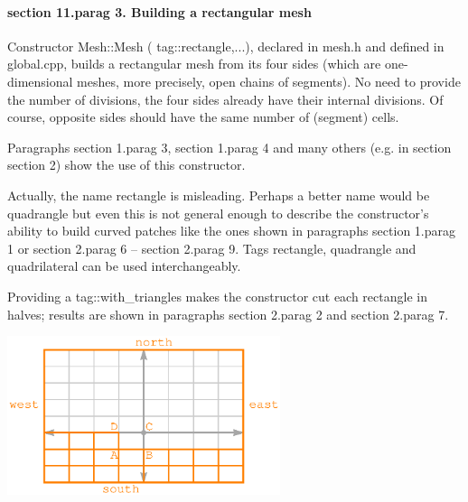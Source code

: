 \paragraph{\numb section 11.\numb parag 3. Building a rectangular mesh}

Constructor {\codett Mesh::Mesh ( tag::rectangle,...)}, declared in {\codett mesh.h} and defined in
{\codett global.cpp}, builds a rectangular mesh from its
four sides (which are one-dimensional meshes, more precisely, open chains of segments).
No need to provide the number of divisions, the four sides already have their internal divisions.
Of course, opposite sides should have the same number of (segment) cells.

Paragraphs \numb section 1.\numb parag 3, \numb section 1.\numb parag 4 and many others
(e.g. in section \numb section 2) show the use of this constructor.

Actually, the name {\codett rectangle} is misleading.
Perhaps a better name would be {\codett quadrangle} but even this is not general enough to
describe the constructor's ability to build curved patches like the ones shown in paragraphs
\numb section 1.\numb parag 1 or \numb section 2.\numb parag 6 -- \numb section 2.\numb parag 9.
Tags {\codett rectangle}, {\codett quadrangle} and {\codett quadrilateral} can be used
interchangeably.

Providing a {\codett tag::with\_triangles} makes the constructor cut each rectangle in halves;
results are shown in paragraphs \numb section 2.\numb parag 2 and \numb section 2.\numb parag 7.

{ 
\centerline{\includegraphics[width=80mm]{fig-rectangle.eps}} }

